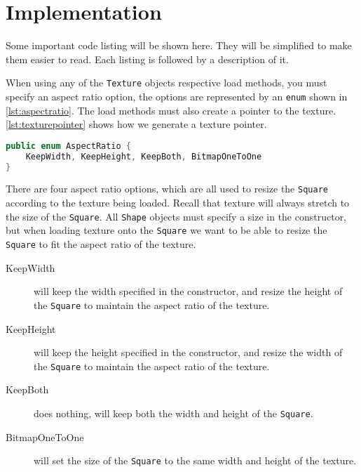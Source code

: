 \section{Implementation}\label{sec:openglimp}

Some important code listing will be shown here. They will be simplified to make them easier to read. Each listing is followed by a description of it.

When using any of the \lstinline|Texture| objects respective load methods, you must specify an aspect ratio option, the options are represented by an \lstinline|enum| shown in \autoref{lst:aspectratio}. The load methods must also create a pointer to the texture. \autoref{lst:texturepointer} shows how we generate a texture pointer.
\begin{lstlisting}[language=java,caption={Aspect ratio enum.},label=lst:aspectratio] 
public enum AspectRatio {
    KeepWidth, KeepHeight, KeepBoth, BitmapOneToOne
}
\end{lstlisting}
There are four aspect ratio options, which are all used to resize the \lstinline|Square| according to the texture being loaded. Recall that texture will always stretch to the size of the \lstinline|Square|. All \lstinline|Shape| objects must specify a size in the constructor, but when loading texture onto the \lstinline|Square| we want to be able to resize the \lstinline|Square| to fit the aspect ratio of the texture.
\begin{description}
\item[KeepWidth] will keep the width specified in the constructor, and resize the height of the \lstinline|Square| to maintain the aspect ratio of the texture.
\item[KeepHeight] will keep the height specified in the constructor, and resize the width of the \lstinline|Square| to maintain the aspect ratio of the texture.
\item[KeepBoth] does nothing, will keep both the width and height of the \lstinline|Square|.
\item[BitmapOneToOne] will set the size of the \lstinline|Square| to the same width and height of the texture.
\end{description}

